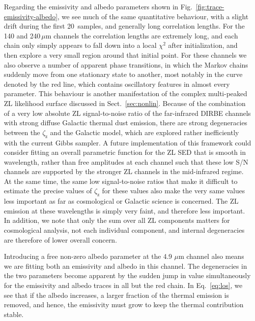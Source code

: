 \documentclass[twocolumn]{aa}
\begin{document}
Regarding the emissivity and albedo parameters shown in
Fig.~\ref{fig:trace-emissivity-albedo}, we see much of the same
quantitative behaviour, with a slight drift during the first
20~samples, and generally long correlation lengths. For the
140 and 240\,$\mu$m channels the correlation lengths are extremely
long, and each chain only simply appears to fall down into a local
$\chi^2$ after initialization, and then explore a very small region
around that initial point. For these channels we also observe
a number of apparent phase transitions, in which the Markov chains
suddenly move from one stationary state to another, most notably in the curve denoted by the red line, which contains oscillatory features in almost every parameter. This behaviour is
another manifestation of the complex multi-peaked ZL likelihood
surface discussed in Sect.~\ref{sec:nonlin}. Because of the
combination of a very low absolute ZL signal-to-noise ratio of the
far-infrared DIRBE channels with strong diffuse Galactic thermal dust
emission, there are strong degeneracies between the
$\zeta_{\mathrm{z}}$ and the Galactic model, which are explored
rather inefficiently with the current Gibbs sampler. A future
implementation of this framework could consider fitting an overall
parametric function for the ZL SED that is smooth in wavelength,
rather than free amplitudes at each channel such that these low S/N
channels are supported by the stronger ZL channels in the mid-infrared
regime. At the same time, the same
low signal-to-noise ratios that make it difficult to estimate the
precise values of $\zeta_{\mathrm{z}}$ for these values also make the
very same values less important as far as cosmological or Galactic
science is concerned. The ZL emission at these
wavelengths is simply very faint, and therefore less
important. In addition, we note that only the sum over all ZL
components matters for cosmological analysis, not each individual
component, and internal degeneracies are therefore of lower overall
concern.

Introducing a free non-zero albedo parameter at the 4.9 $\mu$m channel 
also means we are fitting both an emissivity and albedo in this channel. 
The degeneracies in the two parameters become apparent by the sudden jump 
in value simultaneously for the emissivity and albedo traces in all but 
the red chain. In Eq.~\eqref{eq:los}, we see that if the albedo 
increases, a larger fraction of the thermal emission is removed, and 
hence, the emissivity must grow to keep the thermal contribution stable.
\end{document}
